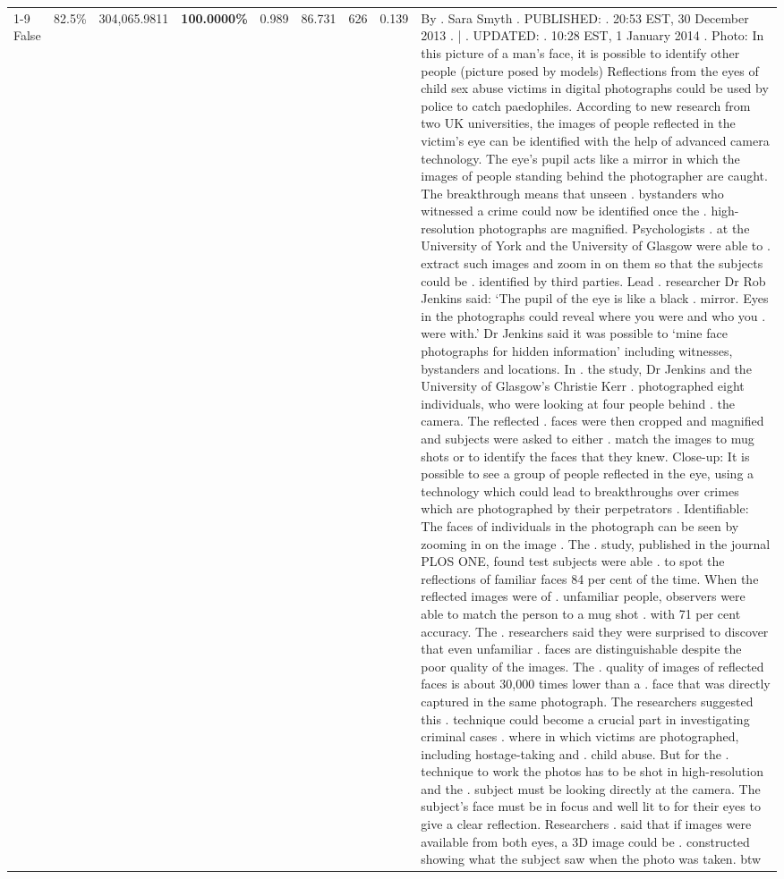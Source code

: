 \begin{table}[H]
\begin{tabular}{lllrlllll}
\cline{1-9} \cline{2-9}
False & 82.5\% & 304,065.9811 & \bfseries \color{red} 100.0000\% & 0.989 & 86.731 & 626 & 0.139 & By . Sara Smyth . PUBLISHED: . 20:53 EST, 30 December 2013 . | . UPDATED: . 10:28 EST, 1 January 2014 . Photo: In this picture of a man's face, it is possible to identify other people (picture posed by models) Reflections from the eyes of child sex abuse victims in digital photographs could be used by police to catch paedophiles. According to new research from two UK universities, the images of people reflected in the victim's eye can be identified with the help of advanced camera technology. The eye's pupil acts like a mirror in which the images of people standing behind the photographer are caught. The breakthrough means that unseen . bystanders who witnessed a crime could now be identified once the . high-resolution photographs are magnified. Psychologists . at the University of York and the University of Glasgow were able to . extract such images and zoom in on them so that the subjects could be . identified by third parties. Lead . researcher Dr Rob Jenkins said: ‘The pupil of the eye is like a black . mirror. Eyes in the photographs could reveal where you were and who you . were with.' Dr Jenkins said it was possible to ‘mine face photographs for hidden information' including witnesses, bystanders and locations. In . the study, Dr Jenkins and the University of Glasgow's Christie Kerr . photographed eight individuals, who were looking at four people behind . the camera. The reflected . faces were then cropped and magnified and subjects were asked to either . match the images to mug shots or to identify the faces that they knew. Close-up: It is possible to see a group of people reflected in the eye, using a technology which could lead to breakthroughs over crimes which are photographed by their perpetrators . Identifiable: The faces of individuals in the photograph can be seen by zooming in on the image . The . study, published in the journal PLOS ONE, found test subjects were able . to spot the reflections of familiar faces 84 per cent of the time. When the reflected images were of . unfamiliar people, observers were able to match the person to a mug shot . with 71 per cent accuracy. The . researchers said they were surprised to discover that even unfamiliar . faces are distinguishable despite the poor quality of the images. The . quality of images of reflected faces is about 30,000 times lower than a . face that was directly captured in the same photograph. The researchers suggested this . technique could become a crucial part in investigating criminal cases . where in which victims are photographed, including hostage-taking and . child abuse. But for the . technique to work the photos has to be shot in high-resolution and the . subject must be looking directly at the camera. The subject's face must be in focus and well lit to for their eyes to give a clear reflection. Researchers . said that if images were available from both eyes, a 3D image could be . constructed showing what the subject saw when the photo was taken. btw \\

\end{tabular}
\end{table}
